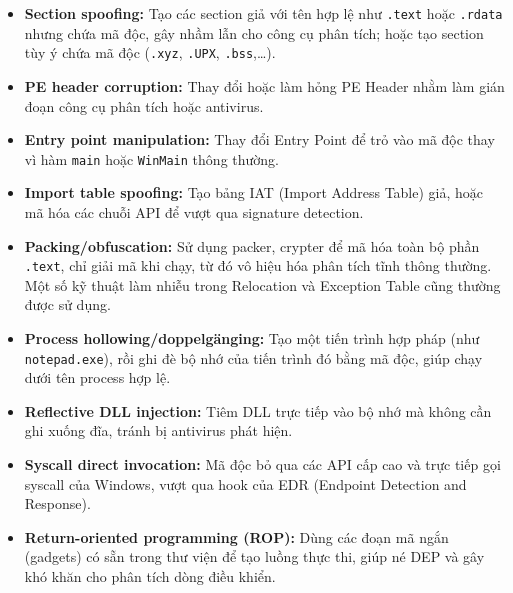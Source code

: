 \begin{itemize}
    \item \textbf{Section spoofing:} Tạo các section giả với tên hợp
        lệ như \texttt{.text} hoặc \texttt{.rdata} nhưng chứa mã độc,
        gây nhầm lẫn cho công cụ phân tích; hoặc tạo section tùy ý
        chứa mã độc (\texttt{.xyz}, \texttt{.UPX}, \texttt{.bss},\dots).

    \item \textbf{PE header corruption:} Thay đổi hoặc làm hỏng PE
        Header nhằm làm gián đoạn công cụ phân tích hoặc antivirus.

    \item \textbf{Entry point manipulation:} Thay đổi Entry Point để
        trỏ vào mã độc thay vì hàm \texttt{main} hoặc \texttt{WinMain}
		thông thường.

    \item \textbf{Import table spoofing:} Tạo bảng IAT (Import Address
        Table) giả, hoặc mã hóa các chuỗi API để vượt qua signature
        detection.

    \item \textbf{Packing/obfuscation:} Sử dụng packer, crypter để mã
        hóa toàn bộ phần \texttt{.text}, chỉ giải mã khi chạy, từ đó
        vô hiệu hóa phân tích tĩnh thông thường. Một số kỹ thuật làm
        nhiễu trong Relocation và Exception Table cũng thường được sử
        dụng.

    \item \textbf{Process hollowing/doppelgänging:} Tạo một tiến trình
        hợp pháp (như \texttt{notepad.exe}), rồi ghi đè bộ nhớ của
        tiến trình đó bằng mã độc, giúp chạy dưới tên process hợp lệ.

    \item \textbf{Reflective DLL injection:} Tiêm DLL trực tiếp vào
        bộ nhớ mà không cần ghi xuống đĩa, tránh bị antivirus phát
        hiện.

    \item \textbf{Syscall direct invocation:} Mã độc bỏ qua các API
        cấp cao và trực tiếp gọi syscall của Windows, vượt qua hook
        của EDR (Endpoint Detection and Response).

    \item \textbf{Return-oriented programming (ROP):} Dùng các đoạn
        mã ngắn (gadgets) có sẵn trong thư viện để tạo luồng thực thi,
        giúp né DEP và gây khó khăn cho phân tích dòng điều khiển.
\end{itemize}

